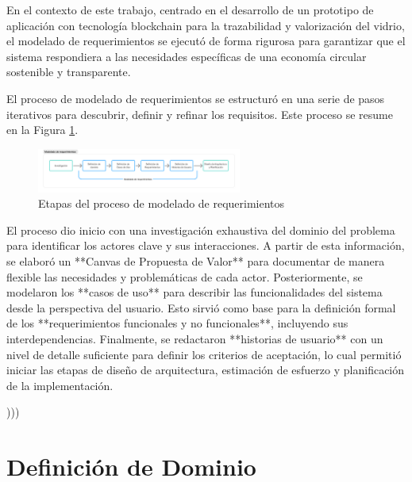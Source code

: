 En el contexto de este trabajo, centrado en el desarrollo de un prototipo de aplicación con tecnología blockchain para la trazabilidad y valorización del vidrio, el modelado de requerimientos se ejecutó de forma rigurosa para garantizar que el sistema respondiera a las necesidades específicas de una economía circular sostenible y transparente.

El proceso de modelado de requerimientos se estructuró en una serie de pasos iterativos para descubrir, definir y refinar los requisitos. Este proceso se resume en la Figura \ref{fig:requirements-modelling-process}.

\begin{figure}[!htpb]
    \centering
    \includegraphics[width=0.6\textwidth]{Figures/requirements-modelling.png}
    \caption{Etapas del proceso de modelado de requerimientos}
    \label{fig:requirements-modelling-process}
\end{figure}

El proceso dio inicio con una investigación exhaustiva del dominio del problema para identificar los actores clave y sus interacciones. A partir de esta información, se elaboró un **Canvas de Propuesta de Valor** para documentar de manera flexible las necesidades y problemáticas de cada actor. Posteriormente, se modelaron los **casos de uso** para describir las funcionalidades del sistema desde la perspectiva del usuario. Esto sirvió como base para la definición formal de los **requerimientos funcionales y no funcionales**, incluyendo sus interdependencias. Finalmente, se redactaron **historias de usuario** con un nivel de detalle suficiente para definir los criterios de aceptación, lo cual permitió iniciar las etapas de diseño de arquitectura, estimación de esfuerzo y planificación de la implementación.

)))
\section{Definición de Dominio}
\label{sec:domain-definition}



